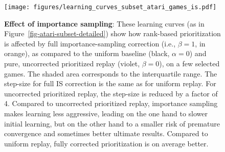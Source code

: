 \documentclass[a4paper]{article}
\begin{document}
\begin{figure}[p]
\centerline{
\texttt{[image: figures/learning\_curves\_subset\_atari\_games\_is.pdf]}
}
\caption{
\label{fig-atari-is}
{\bf Effect of importance sampling}: These learning curves (as in Figure~\ref{fig-atari-subset-detailed})
show how rank-based prioritization is affected by full importance-sampling correction (i.e., $\beta=1$, in orange),
as compared to the uniform baseline (black, $\alpha=0$) and pure, uncorrected prioritized replay (violet, $\beta=0$),
on a few selected games. The shaded area corresponds to the interquartile range.  The step-size for full IS correction is the same as for uniform replay. For uncorrected prioritized replay, the step-size is reduced by a factor of 4.
Compared to uncorrected prioritized replay, importance sampling makes learning less aggressive, 
leading on the one hand to slower initial learning, 
but on the other hand to a smaller risk of premature convergence and sometimes better ultimate results.
Compared to uniform replay, fully corrected prioritization is on average better.
}
\end{figure}
\end{document}
